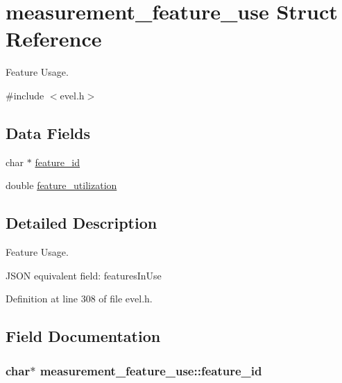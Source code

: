 \hypertarget{structmeasurement__feature__use}{}\section{measurement\+\_\+feature\+\_\+use Struct Reference}
\label{structmeasurement__feature__use}


Feature Usage.  




{\ttfamily \#include $<$evel.\+h$>$}

\subsection*{Data Fields}
\begin{DoxyCompactItemize}
\item 
char $\ast$ \hyperlink{structmeasurement__feature__use_aab070c5ff1a041e0cd424f2cee8d354b}{feature\+\_\+id}
\item 
double \hyperlink{structmeasurement__feature__use_a67c1772a8a83e0e386a3ce5dc783b8ee}{feature\+\_\+utilization}
\end{DoxyCompactItemize}


\subsection{Detailed Description}
Feature Usage. 

J\+S\+O\+N equivalent field\+: features\+In\+Use 

Definition at line 308 of file evel.\+h.



\subsection{Field Documentation}
\hypertarget{structmeasurement__feature__use_aab070c5ff1a041e0cd424f2cee8d354b}{}
\subsubsection[{feature\+\_\+id}]{\setlength{\rightskip}{0pt plus 5cm}char$\ast$ measurement\+\_\+feature\+\_\+use\+::feature\+\_\+id}\label{structmeasurement__feature__use_aab070c5ff1a041e0cd424f2cee8d354b}


